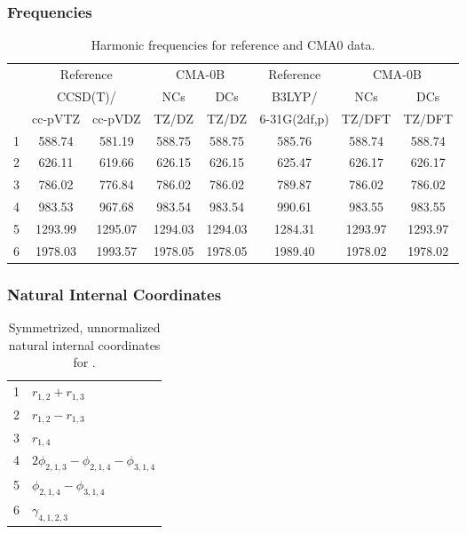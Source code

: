 \documentclass[10pt,oneside]{article}
\begin{document}
\clearpage

\subsubsection*{Frequencies}
\begin{table}[h!]
\centering
\caption{Harmonic frequencies for reference and CMA0 data.}
\begin{tabular}{cccccccc}
\toprule
{} & \multicolumn{2}{c}{Reference} & \multicolumn{2}{c}{CMA-0B} &    Reference & \multicolumn{2}{c}{CMA-0B} \\
{} & \multicolumn{2}{c}{CCSD(T)/} &     NCs &     DCs &       B3LYP/ &     NCs &     DCs \\
{} &   cc-pVTZ & cc-pVDZ &   TZ/DZ &   TZ/DZ & 6-31G(2df,p) &  TZ/DFT &  TZ/DFT \\
\midrule
1 &    588.74 &  581.19 &  588.75 &  588.75 &       585.76 &  588.74 &  588.74 \\
2 &    626.11 &  619.66 &  626.15 &  626.15 &       625.47 &  626.17 &  626.17 \\
3 &    786.02 &  776.84 &  786.02 &  786.02 &       789.87 &  786.02 &  786.02 \\
4 &    983.53 &  967.68 &  983.54 &  983.54 &       990.61 &  983.55 &  983.55 \\
5 &   1293.99 & 1295.07 & 1294.03 & 1294.03 &      1284.31 & 1293.97 & 1293.97 \\
6 &   1978.03 & 1993.57 & 1978.05 & 1978.05 &      1989.40 & 1978.02 & 1978.02 \\
\bottomrule
\end{tabular}
\end{table}

\clearpage

\subsubsection*{Natural Internal Coordinates}
\begin{table}[h!]
\centering
\caption{Symmetrized, unnormalized natural internal coordinates for .}
\small
\begin{tabular}{ll}
  1   & $r_{1,2} + r_{1,3}$ \\
  2   & $r_{1,2} - r_{1,3}$ \\
  3   & $r_{1,4}$ \\
  4   & $2\phi_{2,1,3} - \phi_{2,1,4} - \phi_{3,1,4}$ \\
  5   & $\phi_{2,1,4} - \phi_{3,1,4}$ \\
  6   & $\gamma_{4,1,2,3}$ \\
\end{tabular}
\end{table}
\end{document}
